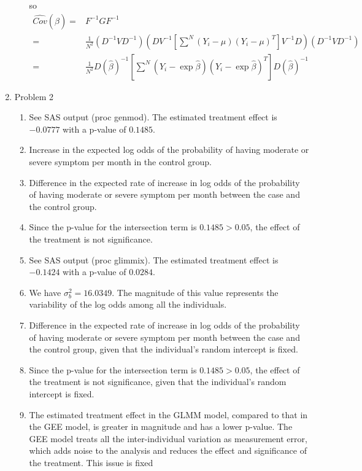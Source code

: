 \documentclass{article}
\begin{document}
\begin{enumerate}
\begin{enumerate}
    so
    \begin{align*}
      \hat{Cov}(\hat{\beta}) = & F^{-1} G F^{-1} \\
      = & \frac{1}{N^2} (D^{-1} V D^{-1}) (D V^{-1} [\sum^N (Y_i - \mu) (Y_i - \mu)^T] V^{-1} D) (D^{-1} V D^{-1}) \\
      = & \frac{1}{N^2} D(\hat{\beta})^{-1} [\sum^N (Y_i - \exp\hat{\beta}) (Y_i - \exp\hat{\beta})^T] D(\hat{\beta})^{-1}
    \end{align*}
  \end{enumerate}
\item Problem 2
  \begin{enumerate}
  \item See SAS output (proc genmod). The estimated treatment effect
    is $-0.0777$ with a p-value of $0.1485$.
  \item Increase in the expected log odds of the probability of having
    moderate or severe symptom per month in the control group.
  \item Difference in the expected rate of increase in log odds of the
    probability of having moderate or severe symptom per month between
    the case and the control group.
  \item Since the p-value for the intersection term is
    $0.1485 > 0.05$, the effect of the treatment is not significance.
  \item See SAS output (proc glimmix). The estimated treatment effect
    is $-0.1424$ with a p-value of $0.0284$.
  \item We have $\sigma^2_b = 16.0349$.  The magnitude of this value
    represents the variability of the log odds among all the
    individuals.
  \item Difference in the expected rate of increase in log odds of the
    probability of having moderate or severe symptom per month between
    the case and the control group, given that the individual's random
    intercept is fixed.
  \item Since the p-value for the intersection term is
    $0.1485 > 0.05$, the effect of the treatment is not significance,
    given that the individual's random intercept is fixed.
  \item The estimated treatment effect in the GLMM model, compared to
    that in the GEE model, is greater in magnitude and has a lower
    p-value. The GEE model treats all the inter-individual variation
    as measurement error, which adds noise to the analysis and reduces
    the effect and significance of the treatment. This issue is fixed

\end{enumerate}
\end{enumerate}
\end{document}
